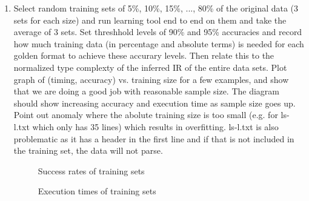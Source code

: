 \begin{enumerate}
\item Select random training sets of 5\%, 10\%, 15\%, ..., 80\% of 
the original data (3 sets for each size) and run learning tool end to end on 
them and take the average of 3 sets. 
Set threshhold levels of 90\% and 95\% accuracies and record how much training data (in percentage and
absolute terms) is needed for each golden format to achieve these accurary levels. Then relate this
to the normalized type complexty of the inferred IR of the entire data sets.
Plot graph of (timing, accuracy) vs. training size 
for a few examples, and show that we are doing a good job with reasonable sample size. The diagram should
show increasing accuracy and execution time as sample size goes up. Point out anomaly
where the abolute training size is too small (e.g. for ls-l.txt which only has 35 lines) which results
in overfitting. ls-l.txt is also problematic as it has a header in the first line and if that is not included
in the training set, the data will not parse.

\begin{figure}
\caption{Success rates of training sets}
\end{figure}

\begin{figure}
\caption{Execution times of training sets}
\end{figure}
\end{enumerate}

